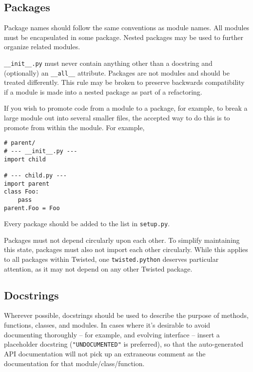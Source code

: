 \subsection{Packages}


Package names should follow the same conventions as module     names. All modules must be encapsulated in some package. Nested     packages may be used to further organize related modules.

\texttt{\_\_init\_\_.\linebreak[1]py} must never contain anything other than a     docstring and (optionally) an \texttt{\_\_all\_\_} attribute. Packages are     not modules and should be treated differently. This rule may be     broken to preserve backwards compatibility if a module is made     into a nested package as part of a refactoring.

If you wish to promote code from a module to a package, for     example, to break a large module out into several smaller     files, the accepted way to do this is to promote from within     the module. For example,\begin{verbatim}
# parent/
# --- __init__.py ---
import child

# --- child.py ---
import parent
class Foo:
    pass
parent.Foo = Foo
\end{verbatim}


Every package should be added to the list in     \texttt{setup.\linebreak[1]py}.

Packages must not depend circularly upon each other.  To simplify     maintaining this state, packages must also not import each other     circularly.  While this applies to all packages within Twisted, one     \texttt{twisted.\linebreak[1]python} deserves particular attention, as it may     not depend on any other Twisted package.

\subsection{Docstrings}


Wherever possible, docstrings should be used to describe the     purpose of methods, functions, classes, and modules. In cases     where it's desirable to avoid documenting thoroughly -- for     example, and evolving interface -- insert a placeholder     docstring (\texttt{"UNDOCUMENTED"} is preferred),     so that the     auto-generated API documentation will not pick up an extraneous     comment as the documentation for that     module/class/function.

